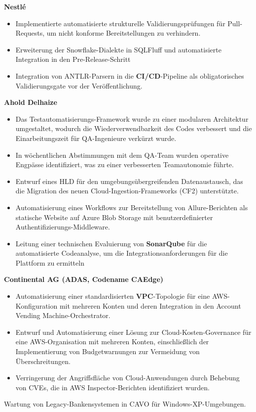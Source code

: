 \vspace{1em}
\noindent \textbf{Nestlé}
\begin{itemize}[label=\tiny$\bullet$, leftmargin=1em, nosep]
	\item Implementierte automatisierte strukturelle Validierungsprüfungen für Pull-Requests, um nicht konforme Bereitstellungen zu verhindern.
	\item Erweiterung der Snowflake-Dialekte in SQLFluff und automatisierte Integration in den Pre-Release-Schritt
	\item Integration von ANTLR-Parsern in die \textbf{CI/CD}-Pipeline als obligatorisches Validierungsgate vor der Veröffentlichung.
\end{itemize}

\vspace{1em}
\noindent \textbf{Ahold Delhaize}
\begin{itemize}[label=\tiny$\bullet$, leftmargin=1em]
	\item Das Testautomatisierungs-Framework wurde zu einer modularen Architektur umgestaltet, wodurch die Wiederverwendbarkeit des Codes verbessert und die Einarbeitungszeit für QA-Ingenieure verkürzt wurde.
	\item In wöchentlichen Abstimmungen mit dem QA-Team wurden operative Engpässe identifiziert, was zu einer verbesserten Teamautonomie führte.
	\item Entwurf eines HLD für den umgebungsübergreifenden Datenaustausch, das die Migration des neuen Cloud-Ingestion-Frameworks (CF2) unterstützte.
	\item Automatisierung eines Workflows zur Bereitstellung von Allure-Berichten als statische Website auf Azure Blob Storage mit benutzerdefinierter Authentifizierungs-Middleware.
	\item Leitung einer technischen Evaluierung von \textbf{SonarQube} für die automatisierte Codeanalyse, um die Integrationsanforderungen für die Plattform zu ermitteln
\end{itemize}

\vspace{1em}
\noindent \textbf{Continental AG (ADAS, Codename CAEdge)}
\begin{itemize}[label=\tiny$\bullet$, leftmargin=1em]
	\item Automatisierung einer standardisierten \textbf{VPC}-Topologie für eine AWS-Konfiguration mit mehreren Konten und deren Integration in den Account Vending Machine-Orchestrator.
	\item Entwurf und Automatisierung einer Lösung zur Cloud-Kosten-Governance für eine AWS-Organisation mit mehreren Konten, einschließlich der Implementierung von Budgetwarnungen zur Vermeidung von Überschreitungen.
	\item Verringerung der Angriffsfläche von Cloud-Anwendungen durch Behebung von CVEs, die in AWS Inspector-Berichten identifiziert wurden.
\end{itemize}

\vspace{5.0ex}
\small
Wartung von Legacy-Bankensystemen in CAVO für Windows-XP-Umgebungen.
